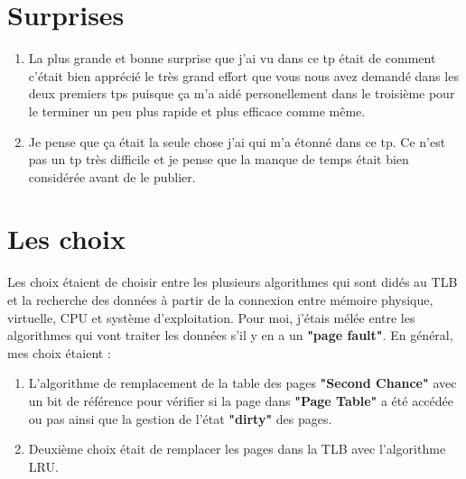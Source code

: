 \documentclass{article}
\begin{document}
\section{Surprises}
\begin{enumerate}
\item La plus grande et bonne surprise que j'ai vu dans ce tp était de comment c'était bien apprécié le très grand effort que vous nous avez demandé dans les deux premiers tps puisque ça m'a aidé personellement dans le troisième pour le terminer un peu plus rapide et plus efficace comme même.\newline
\item Je pense que ça était la seule chose j'ai qui m'a étonné dans ce tp. Ce n'est pas un tp très difficile et je pense que la manque de temps était bien considérée avant de le publier.  
\end{enumerate}

\section{Les choix}
Les choix étaient de choisir entre les plusieurs algorithmes qui sont didés au TLB et la recherche des données à partir de la connexion entre mémoire physique, virtuelle, CPU et système d'exploitation.\newline
Pour moi, j'étais mélée entre les algorithmes qui vont traiter les données s'il y en a un \textbf{"page fault"}.\newline
En général, mes choix étaient :
\begin{enumerate}
\item L'algorithme de remplacement de la table des pages \textbf{"Second Chance"} avec un bit de référence pour vérifier si la page dans \textbf{"Page Table"} a été accédée ou pas ainsi que la gestion de l'état \textbf{"dirty"} des pages.
\item Deuxième choix était de remplacer les pages dans la TLB avec l'algorithme LRU.
\end{enumerate}
\end{document}
